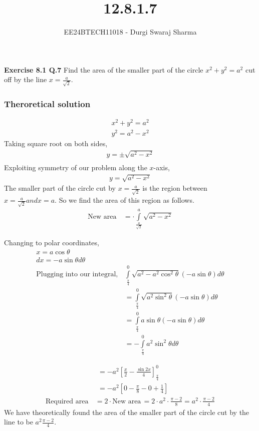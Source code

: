 \documentclass{beamer}
\title{12.8.1.7}
\author{EE24BTECH11018 - Durgi Swaraj Sharma}
\date{}
\providecommand{\sbrak}[1]{\ensuremath{{}\left[#1\right]}}
\providecommand{\brak}[1]{\ensuremath{\left(#1\right)}}
\theoremstyle{remark}
\numberwithin{equation}{section}
\begin{document}
		\frame{\titlepage}

		\begin{frame}
			\textbf{Exercise 8.1 Q.7} Find the area of the smaller part of the circle $x^2+y^2=a^2$ cut off by the line $x=\frac{a}{\sqrt{2}}$.\\
		\end{frame}
		\begin{frame}
			\frametitle{\textbf{Theroretical solution}}
			\begin{align}
				x^2+y^2=a^2\\
				y^2=a^2-x^2
			\end{align}
			Taking square root on both sides,
			\begin{align}
				y = \pm\sqrt{a^2-x^2}\\
			\end{align}
			Exploiting symmetry of our problem along the $x$-axis,
			\begin{align}
				y = \sqrt{a^2-x^2} \label{eq1}
			\end{align}
			The smaller part of the circle cut by $x=\frac{a}{\sqrt{2}}$ is the region between $x=\frac{a}{\sqrt{2}} and x = a$. So we find the area of this region as follows.
			\begin{align}
				\text{New area}\, &= \cdot\int\limits_{\frac{a}{\sqrt{2}}}^{a} \sqrt{a^2-x^2}
			\end{align}
		\end{frame}
		\begin{frame}
			Changing to polar coordinates,
			\begin{align}
				x = a \cos\theta\\
				dx = - a \sin\theta d\theta\\
				\text{Plugging into our integral,}\, &\int\limits_{\frac{\pi}{4}}^{0} \sqrt{a^2-a^2 \cos^2\theta} \brak{-a \sin\theta} d\theta\\
				&= \int\limits_{\frac{\pi}{4}}^{0} \sqrt{a^2 \sin^2\theta} \brak{-a \sin\theta} d\theta\\
				&= \int\limits_{\frac{\pi}{4}}^{0} a \sin\theta \brak{-a \sin\theta} d\theta\\
				&= -\int\limits_{\frac{\pi}{4}}^{0} a^2 \sin^2\theta d\theta
			\end{align}
		\end{frame}
		\begin{frame}
			\begin{align}
				&= -a^2\sbrak{\frac{x}{2}-\frac{\sin2x}{4}}_{\frac{\pi}{4}}^{0}\\
				&= -a^2\sbrak{0 -\frac{\pi}{8} - 0 + \frac{1}{4}}
			\end{align}
			\begin{align}
				\text{Required area}\, &= 2\cdot\text{New area} \, = 2\cdot a^2\cdot\frac{\pi-2}{8} = a^2\cdot\frac{\pi-2}{4}
			\end{align}
			We have theoretically found the area of the smaller part of the circle cut by the line to be $a^2 \frac{\pi-2}{4}$.\\
		\end{frame}
\end{document}
